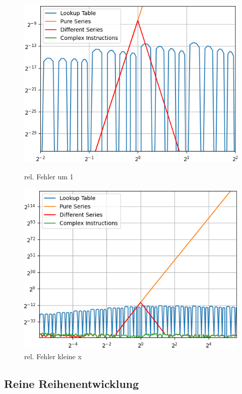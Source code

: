 \documentclass[course=erap] {aspdoc}
\begin{document}
    \begin{figure}[htbp]
        \centering
        \begin{minipage}[b]{0.45\textwidth}
            \centering
            \includegraphics[width=\textwidth]{images/Figure1}
            \caption{rel. Fehler um 1}
        \end{minipage}
        \hfill
        \begin{minipage}[b]{0.45\textwidth}
            \centering
            \includegraphics[width=\textwidth]{images/Figure2}
            \caption{rel. Fehler kleine x}
        \end{minipage}
    \end{figure}

    \subsection{Reine Reihenentwicklung}\label{subsec:reine-reihenentwicklung}
    
\end{document}
